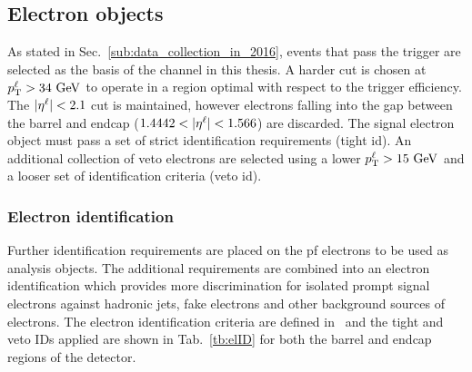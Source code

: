 \subsection{Electron objects}
\label{sub:el}

As stated in Sec.~\ref{sub:data_collection_in_2016}, events that pass the \eTrigger{} trigger are selected as the basis of the \eJets{} channel in this thesis.
A harder \LPT{} cut is chosen at $p_{\mathrm{T}}^{\ell}>34\mathrm{~Ge\hspace{-.08em}V}^{}$ to operate in a region optimal with respect to the trigger efficiency.
The $\lvert \eta^{\ell} \rvert{}<2.1$ cut is maintained, however electrons falling into the gap between the barrel and endcap ($1.4442<\lvert \eta^{\ell} \rvert<1.566$) are discarded.
The signal electron object must pass a set of strict identification requirements (tight \acrshort{id}).
An additional collection of veto electrons are selected using a lower $p_{\mathrm{T}}^{\ell}>15\mathrm{~Ge\hspace{-.08em}V}^{}$ and a looser set of identification criteria (veto \acrshort{id}).

\subsubsection{Electron identification}
\label{ssub:el}
Further identification requirements are placed on the \acrshort{pf} electrons to be used as analysis objects. 
The additional requirements are combined into an electron identification which provides more discrimination for isolated prompt signal electrons against hadronic jets, fake electrons and other background sources of electrons.
The electron identification criteria are defined in~\cite{Event:eSFMethod} and the tight and veto IDs applied are shown in Tab.~\ref{tb:elID} for both the barrel and endcap regions of the detector. 

